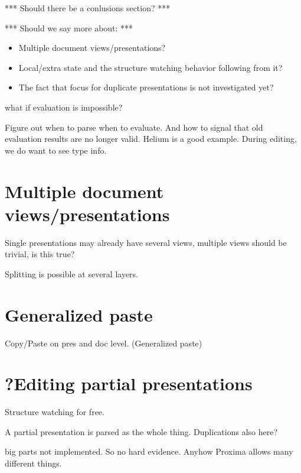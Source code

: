  

*** Should there be a conlusions section? ***

*** Should we say more about: ***
\begin{itemize}
\item Multiple document views/presentations?
\item Local/extra state and the structure watching behavior following from it?
\item The fact that focus for duplicate presentations is not investigated yet?
\end{itemize}


\bc
what if evaluation is impossible?

Figure out when to parse when to evaluate. And how to signal that old evaluation results are no longer valid. Helium is a good example. During editing, we do want to see type info.

\section{Multiple document views/presentations}
 
Single presentations may already have several views, multiple views should be trivial, is  this true?

Splitting is possible at several layers.

\section{Generalized paste}    %

Copy/Paste on pres and doc level. (Generalized paste)

\section{?Editing partial presentations}

Structure watching for free.

A partial presentation is parsed as the whole thing. Duplications also here?

big parts not implemented. So no hard evidence. Anyhow Proxima allows many different  things. 
\ec